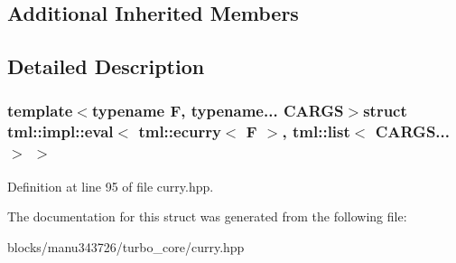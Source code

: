\subsection*{Additional Inherited Members}


\subsection{Detailed Description}
\subsubsection*{template$<$typename F, typename... C\+A\+R\+G\+S$>$struct tml\+::impl\+::eval$<$ tml\+::ecurry$<$ F $>$, tml\+::list$<$ C\+A\+R\+G\+S...$>$ $>$}



Definition at line 95 of file curry.\+hpp.



The documentation for this struct was generated from the following file\+:\begin{DoxyCompactItemize}
\item 
blocks/manu343726/turbo\+\_\+core/curry.\+hpp\end{DoxyCompactItemize}
